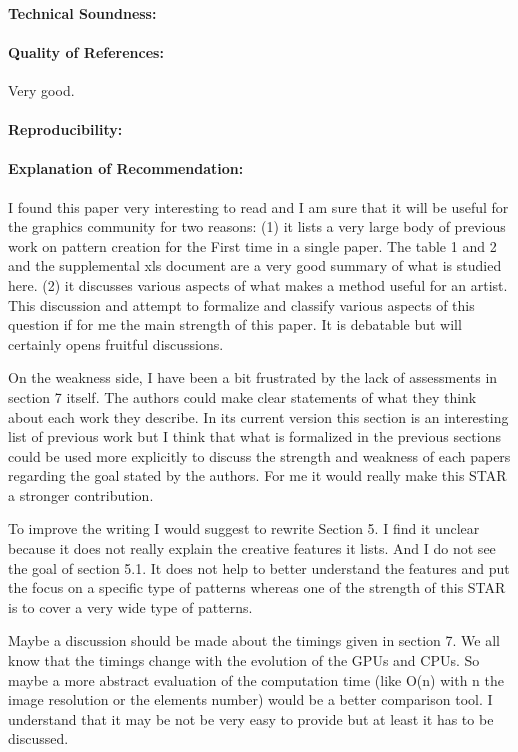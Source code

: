 \documentclass{egpubl}
\begin{document}
\paragraph*{Technical Soundness:} 
\paragraph*{Quality of References:} Very good.
\paragraph*{Reproducibility:} 
\paragraph*{Explanation of Recommendation:} I found this paper very interesting to read and I am sure that it will be useful for the graphics community for two reasons: 
(1) it lists a very large body of previous work on pattern creation for the First time in a single paper. The table 1 and 2 and the supplemental xls document are a very good summary of what is studied here.
(2) it discusses various aspects of what makes a method useful for an artist. This discussion and attempt to formalize and classify various aspects of this question if for me the main strength of this paper. It is debatable but will certainly opens fruitful discussions.

On the weakness side, I have been a bit frustrated by the lack of assessments in section 7 itself. The authors could make clear statements of what they think about each work they describe. In its current version this section is an interesting list of previous work but I think that what is formalized in the previous sections could be used more explicitly to discuss the strength and weakness of each papers regarding the goal stated by the authors. 
For me it would really make this STAR a stronger contribution.

To improve the writing I would suggest to rewrite Section 5. I find it unclear because it does not really explain the creative features it lists. And I do not see the goal of section 5.1. It does not help to better understand the features and put the focus on a specific type of patterns whereas one of the strength of this STAR is to cover a very wide type of patterns. 

Maybe a discussion should be made about the timings given in section 7. We all know that the timings change with the evolution of the GPUs and CPUs. So maybe a more abstract evaluation of the computation time (like O(n) with n the image resolution or the elements number) would be a better comparison tool. I understand that it may be not be very easy to provide but at least it has to be discussed.
\end{document}
